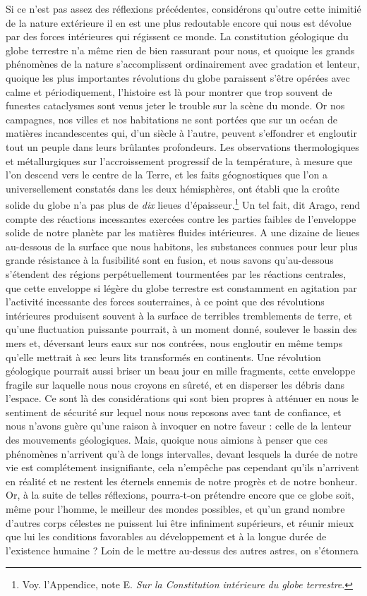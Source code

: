 \documentclass[a4paper, 11pt, oneside, landscape]{article}
\begin{document}
Si ce n'est pas assez des réflexions précédentes, considérons qu'outre cette inimitié de la nature extérieure il en est une plus redoutable encore qui nous est dévolue par des forces intérieures qui régissent ce monde. La constitution géologique du globe terrestre n'a même rien de bien rassurant pour nous, et quoique les grands phénomènes de la nature s'accomplissent ordinairement avec gradation et lenteur, quoique les plus importantes révolutions du globe paraissent s'être opérées avec calme et périodiquement, l'histoire est là pour montrer que trop souvent de funestes cataclysmes sont venus jeter le trouble sur la scène du monde. Or nos campagnes, nos villes et nos habitations ne sont portées que sur un océan de matières incandescentes qui, d'un siècle à l'autre, peuvent s'effondrer et engloutir tout un peuple dans leurs brûlantes profondeurs. Les observations thermologiques et métallurgiques sur l'accroissement progressif de la température, à mesure que l'on descend vers le centre de la Terre, et les faits géognostiques que l'on a universellement constatés dans les deux hémisphères, ont établi que la croûte solide du globe n'a pas plus de \emph{dix} lieues d'épaisseur.\footnote{Voy. l'Appendice, note E. \emph{Sur la Constitution intérieure du globe terrestre}.} Un tel fait, dit Arago, rend compte des réactions incessantes exercées contre les parties faibles de l'enveloppe solide de notre planète par les matières fluides intérieures. A une dizaine de lieues au-dessous de la surface que nous habitons, les substances connues pour leur plus grande résistance à la fusibilité sont en fusion, et nous savons qu'au-dessous s'étendent des régions perpétuellement tourmentées par les réactions centrales, que cette enveloppe si légère du globe terrestre est constamment en agitation par l'activité incessante des forces souterraines, à ce point que des révolutions intérieures produisent souvent à la surface de terribles tremblements de terre, et qu'une fluctuation puissante pourrait, à un moment donné, soulever le bassin des mers et, déversant leurs eaux sur nos contrées, nous engloutir en même temps qu'elle mettrait à sec leurs lits transformés en continents. Une révolution géologique pourrait aussi briser un beau jour en mille fragments, cette enveloppe fragile sur laquelle nous nous croyons en sûreté, et en disperser les débris dans l'espace. Ce sont là des considérations qui sont bien propres à atténuer en nous le sentiment de sécurité sur lequel nous nous reposons avec tant de confiance, et nous n'avons guère qu'une raison à invoquer en notre faveur : celle de la lenteur des mouvements géologiques. Mais, quoique nous aimions à penser que ces phénomènes n'arrivent qu'à de longs intervalles, devant lesquels la durée de notre vie est complétement insignifiante, cela n'empêche pas cependant qu'ils n'arrivent en réalité et ne restent les éternels ennemis de notre progrès et de notre bonheur. Or, à la suite de telles réflexions, pourra-t-on prétendre encore que ce globe soit, même pour l'homme, le meilleur des mondes possibles, et qu'un grand nombre d'autres corps célestes ne puissent lui être infiniment supérieurs, et réunir mieux que lui les conditions favorables au développement et à la longue durée de l'existence humaine ? Loin de le mettre au-dessus des autres astres, on s'étonnera 
\end{document}
